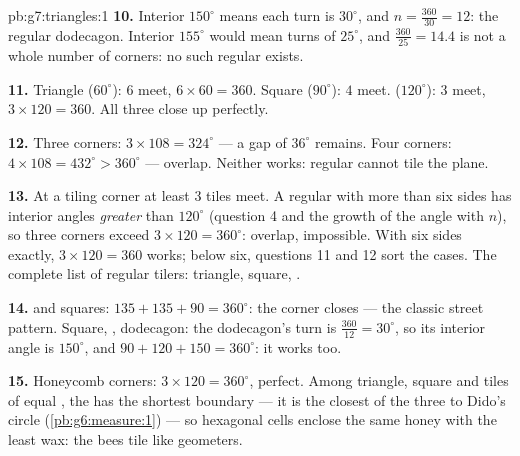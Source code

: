 \begin{solution}{pb:g7:triangles:1}
\textbf{10.} Interior $150^\circ$ means each turn is
$30^\circ$, and $n = \frac{360}{30} = 12$: the regular dodecagon.
Interior $155^\circ$ would mean turns of $25^\circ$, and
$\frac{360}{25} = 14.4$ is not a whole number of corners: no
such regular  exists.

\textbf{11.} Triangle ($60^\circ$): $6$ meet,
$6 \times 60 = 360$. Square ($90^\circ$): $4$ meet. 
($120^\circ$): $3$ meet, $3 \times 120 = 360$. All three close
up perfectly.

\textbf{12.} Three  corners: $3 \times 108 = 324^\circ$
--- a gap of $36^\circ$ remains. Four corners:
$4 \times 108 = 432^\circ > 360^\circ$ --- overlap. Neither
works: regular  cannot tile the plane.

\textbf{13.} At a tiling corner at least $3$ tiles meet. A
regular  with more than six sides has interior angles
\emph{greater} than $120^\circ$ (question 4 and the growth of
the angle with $n$), so three corners exceed
$3 \times 120 = 360^\circ$: overlap, impossible. With six sides
exactly, $3 \times 120 = 360$ works; below six, questions 11
and 12 sort the cases. The complete list of regular tilers:
triangle, square, .

\textbf{14.}  and squares:
$135 + 135 + 90 = 360^\circ$: the corner closes --- the classic
street pattern. Square, , dodecagon: the dodecagon's
turn is $\frac{360}{12} = 30^\circ$, so its interior angle is
$150^\circ$, and $90 + 120 + 150 = 360^\circ$: it works too.

\textbf{15.} Honeycomb corners: $3 \times 120 = 360^\circ$,
perfect. Among triangle, square and  tiles of equal
, the  has the shortest boundary --- it is the
closest of the three to Dido's circle
(\cref{pb:g6:measure:1}) --- so hexagonal cells enclose the
same honey with the least wax: the bees tile like geometers.
\end{solution}
